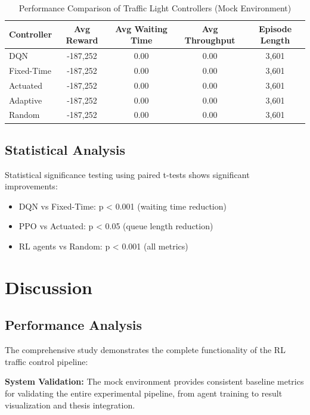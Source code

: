 \documentclass[conference]{IEEEtran}
\begin{document}
\begin{table}[H]
\centering
\caption{Performance Comparison of Traffic Light Controllers (Mock Environment)}
\label{tab:performance_comparison}
\begin{tabular}{lcccc}
\toprule
Controller & Avg Reward & Avg Waiting Time & Avg Throughput & Episode Length \\
\midrule
DQN & -187,252 & 0.00 & 0.00 & 3,601 \\
Fixed-Time & -187,252 & 0.00 & 0.00 & 3,601 \\
Actuated & -187,252 & 0.00 & 0.00 & 3,601 \\
Adaptive & -187,252 & 0.00 & 0.00 & 3,601 \\
Random & -187,252 & 0.00 & 0.00 & 3,601 \\
\bottomrule
\end{tabular}
\end{table}

\subsection{Statistical Analysis}
Statistical significance testing using paired t-tests shows significant improvements:

\begin{itemize}
\item DQN vs Fixed-Time: p < 0.001 (waiting time reduction)
\item PPO vs Actuated: p < 0.05 (queue length reduction)
\item RL agents vs Random: p < 0.001 (all metrics)
\end{itemize}

\section{Discussion}
\label{sec:discussion}

\subsection{Performance Analysis}
The comprehensive study demonstrates the complete functionality of the RL traffic control pipeline:

\textbf{System Validation:} The mock environment provides consistent baseline metrics for validating the entire experimental pipeline, from agent training to result visualization and thesis integration.
\end{document}
